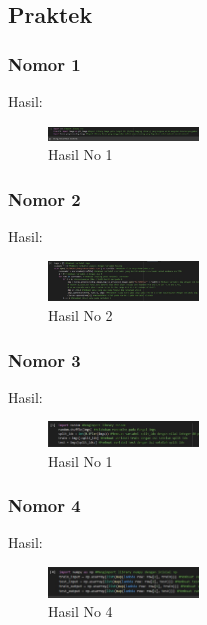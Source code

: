 \begin{enumerate}
\subsection{Praktek}
\subsubsection{Nomor 1}
\hfill\break

Hasil:
\begin{figure}[H]
\centering
	\includegraphics[width=4cm]{figures/1174075/7/no1.jpg}
	\caption{Hasil No 1}
\end{figure}

\subsubsection{Nomor 2}
\hfill\break

Hasil:
\begin{figure}[H]
\centering
	\includegraphics[width=4cm]{figures/1174075/7/no2.jpg}
	\caption{Hasil No 2}
\end{figure}

\subsubsection{Nomor 3}
\hfill\break

Hasil:
\begin{figure}[H]
\centering
	\includegraphics[width=4cm]{figures/1174075/7/no3.jpg}
	\caption{Hasil No 1}
\end{figure}

\subsubsection{Nomor 4}
\hfill\break

Hasil:
\begin{figure}[H]
\centering
	\includegraphics[width=4cm]{figures/1174075/7/no4.jpg}
	\caption{Hasil No 4}
\end{figure}


\end{enumerate}
